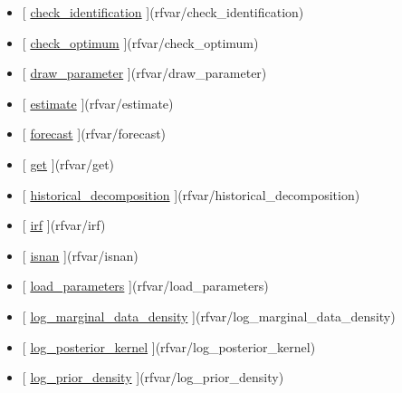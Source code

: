 \documentclass[letterpaper,10pt,english]{sphinxmanual}
\begin{document}
\label{classes/models/@rfvar/rfvar:methods}\begin{itemize}
\item {} 
{[} {\hyperref[classes/models/@rfvar/rfvar:check-identification]{check\_identification}} {]}(rfvar/check\_identification)

\item {} 
{[} {\hyperref[classes/models/@rfvar/rfvar:check-optimum]{check\_optimum}} {]}(rfvar/check\_optimum)

\item {} 
{[} {\hyperref[classes/models/@rfvar/rfvar:draw-parameter]{draw\_parameter}} {]}(rfvar/draw\_parameter)

\item {} 
{[} {\hyperref[classes/models/@rfvar/rfvar:estimate]{estimate}} {]}(rfvar/estimate)

\item {} 
{[} {\hyperref[classes/models/@rfvar/rfvar:forecast]{forecast}} {]}(rfvar/forecast)

\item {} 
{[} {\hyperref[classes/models/@rfvar/rfvar:get]{get}} {]}(rfvar/get)

\item {} 
{[} {\hyperref[classes/models/@rfvar/rfvar:historical-decomposition]{historical\_decomposition}} {]}(rfvar/historical\_decomposition)

\item {} 
{[} {\hyperref[classes/models/@rfvar/rfvar:irf]{irf}} {]}(rfvar/irf)

\item {} 
{[} {\hyperref[classes/models/@rfvar/rfvar:isnan]{isnan}} {]}(rfvar/isnan)

\item {} 
{[} {\hyperref[classes/models/@rfvar/rfvar:load-parameters]{load\_parameters}} {]}(rfvar/load\_parameters)

\item {} 
{[} {\hyperref[classes/models/@rfvar/rfvar:log-marginal-data-density]{log\_marginal\_data\_density}} {]}(rfvar/log\_marginal\_data\_density)

\item {} 
{[} {\hyperref[classes/models/@rfvar/rfvar:log-posterior-kernel]{log\_posterior\_kernel}} {]}(rfvar/log\_posterior\_kernel)

\item {} 
{[} {\hyperref[classes/models/@rfvar/rfvar:log-prior-density]{log\_prior\_density}} {]}(rfvar/log\_prior\_density)


\end{itemize}
\end{document}
